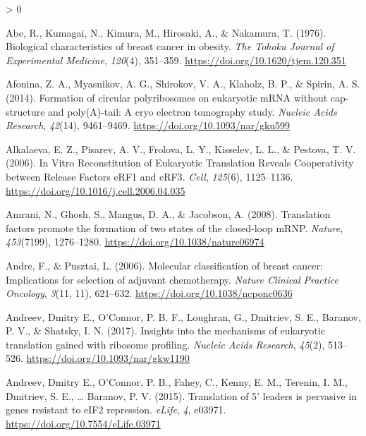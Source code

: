 \documentclass[
  12pt,
  openany]{book}
\newlength{\cslhangindent}
\newenvironment{CSLReferences}[2] %
 {%
  \setlength{\parindent}{0pt}
  \ifodd #1 \everypar{\setlength{\hangindent}{\cslhangindent}}\ignorespaces\fi
  \ifnum #2 > 0
  \setlength{\parskip}{#2\baselineskip}
  \fi
 }%
 {}
\begin{document}
\hypertarget{refs}{}
\begin{CSLReferences}{1}{0}
\leavevmode\hypertarget{ref-Abe1976}{}%
Abe, R., Kumagai, N., Kimura, M., Hirosaki, A., \& Nakamura, T. (1976). Biological characteristics of breast cancer in obesity. \emph{The Tohoku Journal of Experimental Medicine}, \emph{120}(4), 351--359. \url{https://doi.org/10.1620/tjem.120.351}

\leavevmode\hypertarget{ref-Afonina2014}{}%
Afonina, Z. A., Myasnikov, A. G., Shirokov, V. A., Klaholz, B. P., \& Spirin, A. S. (2014). Formation of circular polyribosomes on eukaryotic {mRNA} without cap-structure and poly({A})-tail: A cryo electron tomography study. \emph{Nucleic Acids Research}, \emph{42}(14), 9461--9469. \url{https://doi.org/10.1093/nar/gku599}

\leavevmode\hypertarget{ref-Alkalaeva2006}{}%
Alkalaeva, E. Z., Pisarev, A. V., Frolova, L. Y., Kisselev, L. L., \& Pestova, T. V. (2006). In {Vitro Reconstitution} of {Eukaryotic Translation Reveals Cooperativity} between {Release Factors eRF1} and {eRF3}. \emph{Cell}, \emph{125}(6), 1125--1136. \url{https://doi.org/10.1016/j.cell.2006.04.035}

\leavevmode\hypertarget{ref-Amrani2008}{}%
Amrani, N., Ghosh, S., Mangus, D. A., \& Jacobson, A. (2008). Translation factors promote the formation of two states of the closed-loop {mRNP}. \emph{Nature}, \emph{453}(7199), 1276--1280. \url{https://doi.org/10.1038/nature06974}

\leavevmode\hypertarget{ref-Andre2006}{}%
Andre, F., \& Pusztai, L. (2006). Molecular classification of breast cancer: Implications for selection of adjuvant chemotherapy. \emph{Nature Clinical Practice Oncology}, \emph{3}(11, 11), 621--632. \url{https://doi.org/10.1038/ncponc0636}

\leavevmode\hypertarget{ref-Andreev2017}{}%
Andreev, Dmitry E., O'Connor, P. B. F., Loughran, G., Dmitriev, S. E., Baranov, P. V., \& Shatsky, I. N. (2017). Insights into the mechanisms of eukaryotic translation gained with ribosome profiling. \emph{Nucleic Acids Research}, \emph{45}(2), 513--526. \url{https://doi.org/10.1093/nar/gkw1190}

\leavevmode\hypertarget{ref-Andreev2015}{}%
Andreev, Dmitry E., O'Connor, P. B., Fahey, C., Kenny, E. M., Terenin, I. M., Dmitriev, S. E., \ldots{} Baranov, P. V. (2015). Translation of 5' leaders is pervasive in genes resistant to {eIF2} repression. \emph{eLife}, \emph{4}, e03971. \url{https://doi.org/10.7554/eLife.03971}


\end{CSLReferences}
\end{document}
